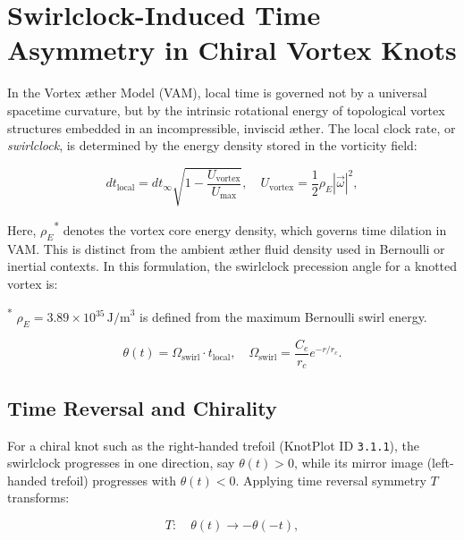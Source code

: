 
\section{Swirlclock-Induced Time Asymmetry in Chiral Vortex Knots}

In the Vortex \ae ther Model (VAM), local time is governed not by a universal spacetime curvature, but by the intrinsic rotational energy of topological vortex structures embedded in an incompressible, inviscid \ae ther. The local clock rate, or \emph{swirlclock}, is determined by the energy density stored in the vorticity field:

\begin{equation}
dt_{\text{local}} = dt_{\infty} \sqrt{1 - \frac{U_{\text{vortex}}}{U_{\text{max}}}}, \quad U_{\text{vortex}} = \frac{1}{2} \rho_{\scriptscriptstyle\boldsymbol\!E}|\vec{\omega}|^2,
\end{equation}

\noindent
Here, \( \rho_{\scriptscriptstyle\boldsymbol\!E}\)\textsuperscript{*} denotes the vortex core energy density,
which governs time dilation in VAM. This is distinct from the ambient æther fluid density used in Bernoulli or inertial contexts. In this formulation, the swirlclock precession angle for a knotted vortex is:

\vspace{0.5em}
\noindent\textsuperscript{*}\small
\( \rho_{\scriptscriptstyle\boldsymbol\!E}= 3.89 \times 10^{35} \, \text{J/m}^3 \)
is defined from the maximum Bernoulli swirl energy.

\begin{equation}
\theta(t) = \Omega_{\text{swirl}} \cdot t_{\text{local}}, \quad \Omega_{\text{swirl}} = \frac{C_e}{r_c} e^{-r/r_c}.
\end{equation}

\subsection{Time Reversal and Chirality}

For a chiral knot such as the right-handed trefoil (KnotPlot ID \texttt{3.1.1}), the swirlclock progresses in one direction, say $\theta(t) > 0$, while its mirror image (left-handed trefoil) progresses with $\theta(t) < 0$. Applying time reversal symmetry $T$ transforms:

\begin{equation}
T: \quad \theta(t) \rightarrow -\theta(-t),
\end{equation}

